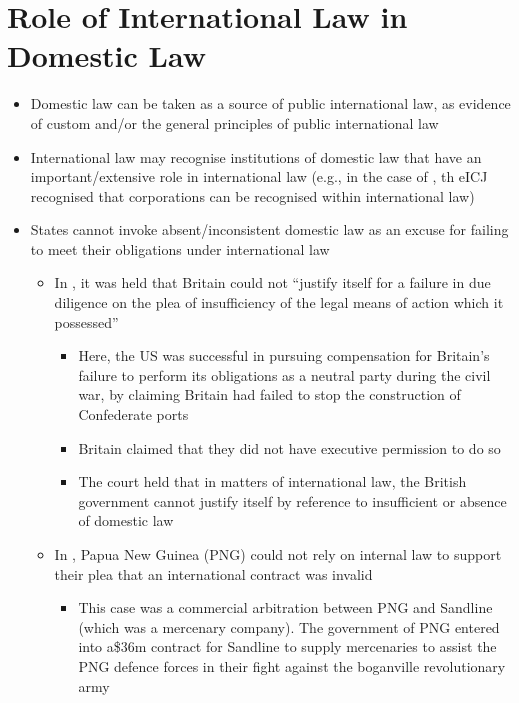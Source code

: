 \section{Role of International Law in Domestic Law}
\begin{itemize}
    \item Domestic law can be taken as a source of public international law, as evidence of custom and/or the general principles of public international law
    \item International law may recognise institutions of domestic law that have an important/extensive role in international law (e.g., in the case of , th eICJ recognised that corporations can be recognised within international law)
    \item States cannot invoke absent/inconsistent domestic law as an excuse for failing to meet their obligations under international law
    \begin{itemize}
        \item In , it was held that Britain could not ``justify itself for a failure in due diligence on the plea of insufficiency of the legal means of action which it possessed''
        \begin{itemize}
            \item Here, the US was successful in pursuing compensation for Britain's failure to perform its obligations as a neutral party during the civil war, by claiming Britain had failed to stop the construction of Confederate ports
            \item Britain claimed that they did not have executive permission to do so
            \item The court held that in matters of international law, the British government cannot justify itself by reference to insufficient or absence of domestic law
        \end{itemize}
        \item In , Papua New Guinea (PNG) could not rely on internal law to support their plea that an international contract was invalid
        \begin{itemize}
            \item This case was a commercial arbitration between PNG and Sandline (which was a mercenary company). The government of PNG entered into a\$36m contract for Sandline to supply mercenaries to assist the PNG defence forces in their fight against the boganville revolutionary army

\end{itemize}
\end{itemize}
\end{itemize}
